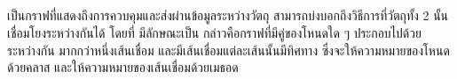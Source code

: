 \subsection{{\scg}}

\FirstTimeDefine{\scg}{\scgEN} เป็นกราฟที่แสดงถึงการควบคุมและส่งผ่านข้อมูลระหว่างวัตถุ สามารถบ่งบอกถึงวิธีการที่วัตถุทั้ง 2 
นั้นเชื่อมโยงระหว่างกันได้ \cite{Ryder1979} โดยที่{\scg} มีลักษณะเป็น 
\FirstTimeDefine{\DirectedMultiGraph}{\DirectedMultiGraphEN} กล่าวคือกราฟที่มีคู่ของโหนดใด ๆ 
ประกอบไปด้วย ระหว่างกัน มากกว่าหนึ่งเส้นเชื่อม 
และมีเส้นเชื่อมแต่ละเส้นนั้นมีทิศทาง \cite{39323220090101} ซึ่ง{\scg}จะให้ความหมายของโหนดด้วยคลาส 
และให้ความหมายของเส้นเชื่อมด้วยเมธอด


